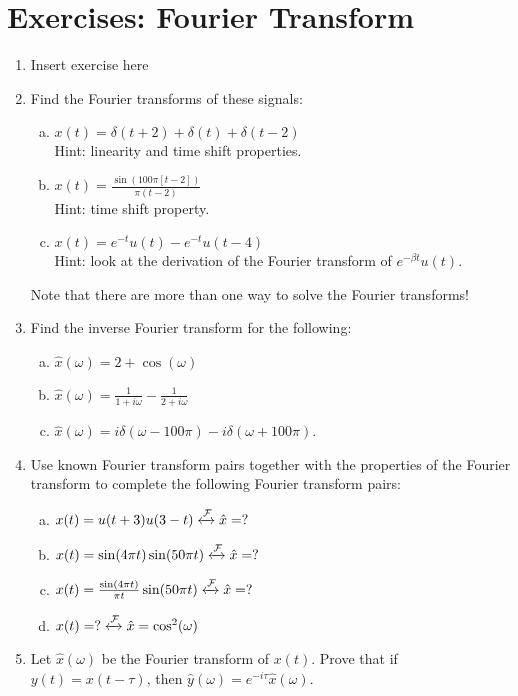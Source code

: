 \newpage
\section{Exercises: Fourier Transform}
\begin{enumerate}
\item Insert exercise here
\item Find the Fourier transforms of these signals:
\begin{enumerate}[a)]
\item $x(t)=\delta(t+2)+\delta(t)+\delta(t-2)$ \\Hint: linearity and time shift properties.
\item $x(t)=\frac{\sin(100\pi [t-2])}{\pi (t-2)}$ \\Hint: time shift property.
\item $x(t)=e^{-t}u(t) - e^{-t} u(t-4)$ \\Hint: look at the derivation of the Fourier transform of $e^{-\beta t} u(t)$.
\end{enumerate}
Note that there are more than one way to solve the Fourier transforms!

\item Find the inverse Fourier transform for the following:
\begin{enumerate}[a)]
\item $\hat{x}(\omega)= 2 + \cos(\omega)$
\item $\hat{x}(\omega) = \frac{1}{1+i\omega} - \frac{1}{2+i\omega}$
\item $\hat{x}(\omega) = i \delta(\omega - 100\pi) - i\delta(\omega + 100\pi)$.
\end{enumerate}

\item Use known Fourier transform pairs together with the properties of the Fourier transform to complete the following Fourier transform pairs:
  \begin{enumerate}[a)]
  \item $x(t) = u(t+3)u(3-t) \xleftrightarrow{\mathcal{F}} \hat{x} = ?$
  \item $x(t) = \sin(4\pi t) \sin(50 \pi t)  \xleftrightarrow{\mathcal{F}} \hat{x} = ?$
  \item $x(t) = \frac{\sin(4\pi t)}{\pi t} \sin(50 \pi t)  \xleftrightarrow{\mathcal{F}} \hat{x} = ?$
  \item $x(t) = ?  \xleftrightarrow{\mathcal{F}} \hat{x} = \cos^2(\omega)$    
  \end{enumerate}


\item Let $\hat{x}(\omega)$ be the Fourier transform of $x(t)$. Prove that if $y(t)=x(t-\tau)$, then $\hat{y}(\omega)=e^{-i\tau}\hat{x}(\omega)$. 
  
  
  
  
\end{enumerate}
